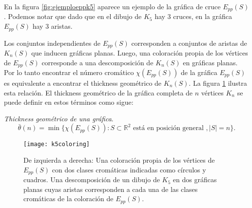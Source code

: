 En la figura \ref{fig:ejemploeppk5} aparece un ejemplo de la gráfica de cruce $E_{pp}(S)$.
Podemos notar que dado que en el dibujo de $K_5$ hay 3 cruces, en la gráfica $E_{pp}(S)$
hay 3 aristas.

Los conjuntos independientes de $E_{pp}(S)$ corresponden a conjuntos de aristas de $K_n(S)$
que inducen gráficas planas. Luego, una coloración propia de los vértices de $E_{pp}(S)$
corresponde a una descomposición de $K_n(S)$ en gráficas planas.
Por lo tanto encontrar el número cromático $\chi(E_{pp}(S))$ de la gráfica
$E_{pp}(S)$ es equivalente a encontrar el thickness geométrico de $K_n(S)$.
La figura \ref{fig:k5coloring} ilustra esta relación.
El thickness geométrico de la gráfica completa de $n$ vértices $K_n$ se puede
definir en estos términos como sigue:
\begin{definition}{\emph{Thickness geométrico de una gráfica}.}
  \[\bar{\theta}(n) = \min\{ \chi(E_{pp}(S)): S \subset \mathbb{R}^2 \text{ está en posición general }, |S|=n \}.\]
\end{definition}
\begin{figure}
  \centering
  \texttt{[image: k5coloring]}
  \caption{De izquierda a derecha: Una coloración propia de los vértices de $E_{pp}(S)$ con dos
  clases cromáticas indicadas como círculos y cuadros.
  Una descomposición de un dibujo de $K_5$ en dos gráficas planas
  cuyas aristas corresponden a cada una de las clases cromáticas de la coloración
  de $E_{pp}(S)$.}
  \label{fig:k5coloring}
\end{figure}


